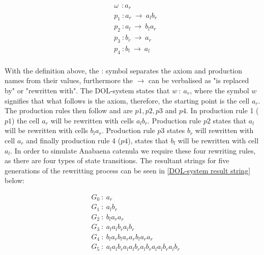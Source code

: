 \begin{equation} \label{DOL-system example}
\begin{aligned}
	&\omega~~ : a_r \\
	&p_1~ :  a_r~ \rightarrow~ a_l b_r\\
	&p_2~ :  a_l~ \rightarrow~ b_l a_r\\
	&p_3~ :  b_r~ \rightarrow~ a_r\\
	&p_4~ :  b_l~ \rightarrow~ a_l\\
\end{aligned}
\end{equation}

\noindent
With the definition above, the : symbol separates the axiom and production names from their values, furthermore the $\rightarrow$ can be verbalised as "is replaced by" or "rewritten with". The DOL-system states that $w~ :~ a_r$, where the symbol $w$ signifies that what follows is the axiom, therefore, the starting point is the cell $a_r$. The production rules then follow and are $p1, p2, p3$ and $p4$. In production rule 1 ($p1$) the cell $a_r$ will be rewritten with cells $a_l b_r$. Production rule $p2$ states that $a_l$ will be rewritten with cells $b_l a_r$. Production rule $p3$ states $b_r$ will rewritten with cell $a_r$ and finally production rule 4 ($p4$), states that $b_l$ will be rewritten with cell $a_l$. In order to simulate Anabaena catenula we require these four rewriting rules, as there are four types of state transitions. The resultant strings for five generations of the rewritting process can be seen in \ref{DOL-system result string} below: 

\begin{equation} \label{DOL-system result string}
\begin{aligned}
	& G_0~ :~ a_r \\
	& G_1~ :~ a_l b_r \\
	& G_2~ :~ b_l a_r a_r \\
	& G_3~ :~ a_l a_l b_r a_l b_r \\
	& G_4~ :~ b_l a_r b_l a_r a_r b_l a_r a_r \\
	& G_5~ :~ a_l a_l b_r a_l a_l b_r a_l b_r a_l a_l b_r a_l b_r \\
\end{aligned}
\end{equation}

